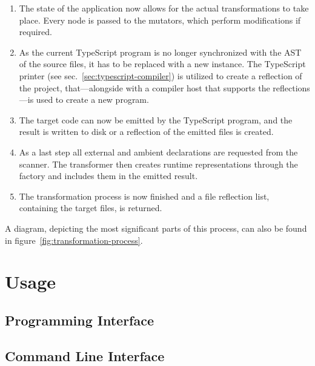 \begin{enumerate}
  \item The state of the application now allows for the actual transformations to take place. Every node is passed to the mutators, which perform modifications if required.
  \item As the current TypeScript program is no longer synchronized with the AST of the source files, it has to be replaced with a new instance. The TypeScript printer (see sec.~\ref{sec:typescript-compiler}) is utilized to create a reflection of the project, that---alongside with a compiler host that supports the reflections---is used to create a new program.
  \item The target code can now be emitted by the TypeScript program, and the result is written to disk or a reflection of the emitted files is created.
  \item As a last step all external and ambient declarations are requested from the scanner. The transformer then creates runtime representations through the factory and includes them in the emitted result.
  \item The transformation process is now finished and a file reflection list, containing the target files, is returned.
\end{enumerate}
A diagram, depicting the most significant parts of this process, can also be found in figure~\ref{fig:transformation-process}.

\section{Usage}
\label{sec:usage}

\subsection{Programming Interface}
\label{sec:usage-api}

\subsection{Command Line Interface}
\label{sec:usage-cli}
